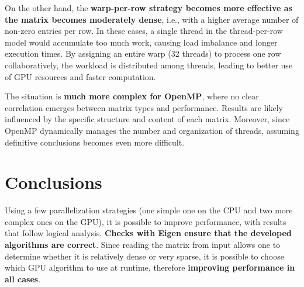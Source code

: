 \documentclass[conference]{IEEEtran}
\begin{document}
On the other hand, the \textbf{warp-per-row strategy becomes more effective as the matrix becomes moderately dense}, i.e., with a higher average number of non-zero entries per row. In these cases, a single thread in the thread-per-row model would accumulate too much work, causing load imbalance and longer execution times. By assigning an entire warp (32 threads) to process one row collaboratively, the workload is distributed among threads, leading to better use of GPU resources and faster computation.

The situation is \textbf{much more complex for OpenMP}, where no clear correlation emerges between matrix types and performance. Results are likely influenced by the specific structure and content of each matrix. Moreover, since OpenMP dynamically manages the number and organization of threads, assuming definitive conclusions becomes even more difficult.

\section{Conclusions}

Using a few parallelization strategies (one simple one on the CPU and two more complex ones on the GPU), it is possible to improve performance, with results that follow logical analysis. \textbf{Checks with Eigen ensure that the developed algorithms are correct}. Since reading the matrix from input allows one to determine whether it is relatively dense or very sparse, it is possible to choose which GPU algorithm to use at runtime, therefore \textbf{improving performance in all cases}.



\end{document}
